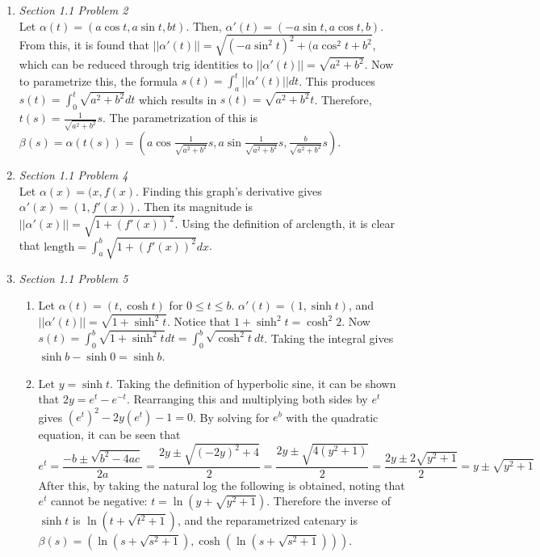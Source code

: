 \documentclass{article}
\begin{document}
\begin{enumerate}

\item \textit{Section 1.1 Problem 2}\\
Let $\alpha(t) = (a\cos{t},a\sin{t},bt)$.
Then, $\alpha'(t) = (-a\sin{t},a\cos{t},b)$.
From this, it is found that $||\alpha'(t)|| = \sqrt{(-a\sin^2{t})^2+(a\cos^2{t}+b^2}$, which can be reduced through trig identities to $||\alpha'(t)|| = \sqrt{a^2+b^2}$.
Now to parametrize this, the formula $s(t) = \int_a^t{||\alpha'(t)||}dt$. 
This produces $s(t) = \int_0^t{\sqrt{a^2+b^2}}dt$ which results in $s(t) = \sqrt{a^2+b^2}t$. 
Therefore, $t(s) = \frac{1}{\sqrt{a^2+b^2}}s$.
The parametrization of this is $\beta(s) = \alpha(t(s)) = (a\cos{\frac{1}{\sqrt{a^2+b^2}}s}, a\sin{\frac{1}{\sqrt{a^2+b^2}}s}, \frac{b}{\sqrt{a^2+b^2}}s)$.

\item \textit{Section 1.1 Problem 4}\\
Let $\alpha(x) = (x, f(x)$. 
Finding this graph's derivative gives $\alpha'(x) = (1, f'(x))$. 
Then its magnitude is $||\alpha'(x)|| = \sqrt{1+(f'(x))^2}$.
Using the definition of arclength, it is clear that $\textrm{length} = \int_a^b{\sqrt{1+(f'(x))^2}}dx$.

\item \textit{Section 1.1 Problem 5}\\
\begin{enumerate}
\item Let $\alpha(t) = (t, \cosh{t})$ for $0\leq t \leq b$. 
$\alpha'(t) = (1, \sinh{t})$, and $||\alpha'(t)|| = \sqrt{1+\sinh^2{t}}$.
Notice that $1 + \sinh^2{t} = \cosh^2{2}$. 
Now $s(t) = \int_0^b\sqrt{1+\sinh^2{t}}dt = \int_0^b\sqrt{\cosh^2{t}}dt$.
Taking the integral gives $\sinh{b} - \sinh{0} = \sinh{b}$.

\item Let $y = \sinh{t}$. 
Taking the definition of hyperbolic sine, it can be shown that $2y = e^t - e^{-t}$.
Rearranging this and multiplying both sides by $e^t$ gives $(e^t)^2 - 2y(e^t) - 1 = 0$. 
By solving for $e^b$ with the quadratic equation, it can be seen that
\begin{equation*}
e^t = \frac{-b\pm\sqrt{b^2-4ac}}{2a} = \frac{2y\pm\sqrt{(-2y)^2+4}}{2} = \frac{2y\pm\sqrt{4(y^2+1)}}{2} = \frac{2y\pm2\sqrt{y^2+1}}{2} = y \pm \sqrt{y^2+1}
\end{equation*} 
After this, by taking the natural log the following is obtained, noting that $e^t$ cannot be negative: $t = \ln(y + \sqrt{y^2+1})$.
Therefore the inverse of $\sinh{t}$ is $\ln(t + \sqrt{t^2 + 1})$, and the reparametrized catenary is $\beta(s) = (\ln(s+\sqrt{s^2+1}), \cosh({\ln(s+\sqrt{s^2+1})}))$.


\end{enumerate}
\end{enumerate}
\end{document}
